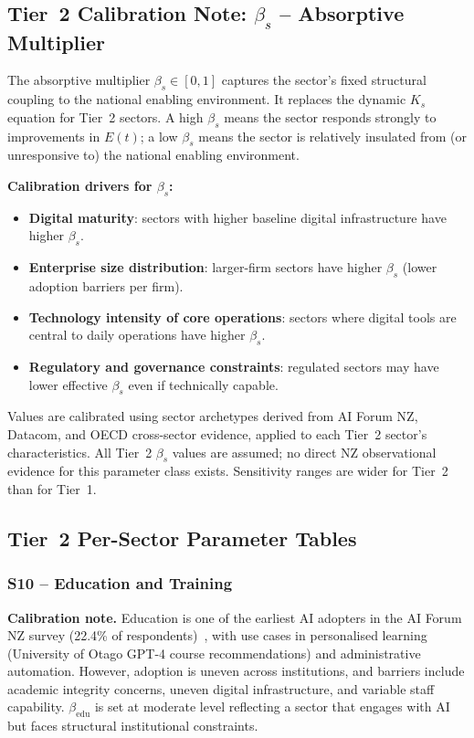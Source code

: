 \documentclass[11pt,a4paper]{article}
\begin{document}
\subsection{Tier~2 Calibration Note: $\beta_s$ -- Absorptive Multiplier}

The absorptive multiplier $\beta_s \in [0,1]$ captures the sector's fixed structural coupling to the national enabling environment. It replaces the dynamic $K_s$ equation for Tier~2 sectors. A high $\beta_s$ means the sector responds strongly to improvements in $E(t)$; a low $\beta_s$ means the sector is relatively insulated from (or unresponsive to) the national enabling environment.

\textbf{Calibration drivers for $\beta_s$:}
\begin{itemize}
  \item \textbf{Digital maturity}: sectors with higher baseline digital infrastructure have higher $\beta_s$.
  \item \textbf{Enterprise size distribution}: larger-firm sectors have higher $\beta_s$ (lower adoption barriers per firm).
  \item \textbf{Technology intensity of core operations}: sectors where digital tools are central to daily operations have higher $\beta_s$.
  \item \textbf{Regulatory and governance constraints}: regulated sectors may have lower effective $\beta_s$ even if technically capable.
\end{itemize}

Values are calibrated using sector archetypes derived from AI Forum NZ, Datacom, and OECD cross-sector evidence, applied to each Tier~2 sector's characteristics. All Tier~2 $\beta_s$ values are assumed; no direct NZ observational evidence for this parameter class exists. Sensitivity ranges are wider for Tier~2 than for Tier~1.

\subsection{Tier~2 Per-Sector Parameter Tables}

\subsubsection*{S10 -- Education and Training}

\textbf{Calibration note.} Education is one of the earliest AI adopters in the AI Forum NZ survey (22.4\% of respondents)~\cite{aiforum2024}, with use cases in personalised learning (University of Otago GPT-4 course recommendations) and administrative automation. However, adoption is uneven across institutions, and barriers include academic integrity concerns, uneven digital infrastructure, and variable staff capability. $\beta_{\text{edu}}$ is set at moderate level reflecting a sector that engages with AI but faces structural institutional constraints.
\end{document}
